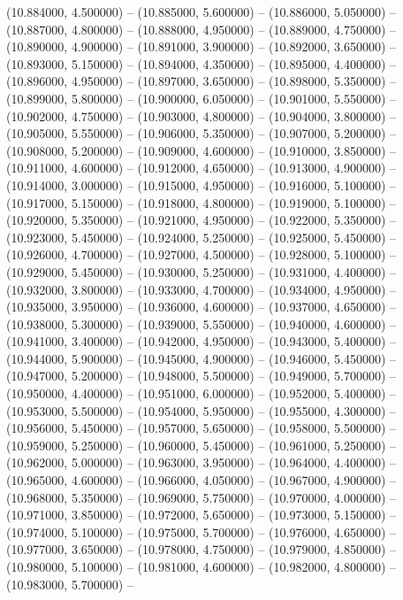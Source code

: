 (10.884000, 4.500000) -- 
(10.885000, 5.600000) -- 
(10.886000, 5.050000) -- 
(10.887000, 4.800000) -- 
(10.888000, 4.950000) -- 
(10.889000, 4.750000) -- 
(10.890000, 4.900000) -- 
(10.891000, 3.900000) -- 
(10.892000, 3.650000) -- 
(10.893000, 5.150000) -- 
(10.894000, 4.350000) -- 
(10.895000, 4.400000) -- 
(10.896000, 4.950000) -- 
(10.897000, 3.650000) -- 
(10.898000, 5.350000) -- 
(10.899000, 5.800000) -- 
(10.900000, 6.050000) -- 
(10.901000, 5.550000) -- 
(10.902000, 4.750000) -- 
(10.903000, 4.800000) -- 
(10.904000, 3.800000) -- 
(10.905000, 5.550000) -- 
(10.906000, 5.350000) -- 
(10.907000, 5.200000) -- 
(10.908000, 5.200000) -- 
(10.909000, 4.600000) -- 
(10.910000, 3.850000) -- 
(10.911000, 4.600000) -- 
(10.912000, 4.650000) -- 
(10.913000, 4.900000) -- 
(10.914000, 3.000000) -- 
(10.915000, 4.950000) -- 
(10.916000, 5.100000) -- 
(10.917000, 5.150000) -- 
(10.918000, 4.800000) -- 
(10.919000, 5.100000) -- 
(10.920000, 5.350000) -- 
(10.921000, 4.950000) -- 
(10.922000, 5.350000) -- 
(10.923000, 5.450000) -- 
(10.924000, 5.250000) -- 
(10.925000, 5.450000) -- 
(10.926000, 4.700000) -- 
(10.927000, 4.500000) -- 
(10.928000, 5.100000) -- 
(10.929000, 5.450000) -- 
(10.930000, 5.250000) -- 
(10.931000, 4.400000) -- 
(10.932000, 3.800000) -- 
(10.933000, 4.700000) -- 
(10.934000, 4.950000) -- 
(10.935000, 3.950000) -- 
(10.936000, 4.600000) -- 
(10.937000, 4.650000) -- 
(10.938000, 5.300000) -- 
(10.939000, 5.550000) -- 
(10.940000, 4.600000) -- 
(10.941000, 3.400000) -- 
(10.942000, 4.950000) -- 
(10.943000, 5.400000) -- 
(10.944000, 5.900000) -- 
(10.945000, 4.900000) -- 
(10.946000, 5.450000) -- 
(10.947000, 5.200000) -- 
(10.948000, 5.500000) -- 
(10.949000, 5.700000) -- 
(10.950000, 4.400000) -- 
(10.951000, 6.000000) -- 
(10.952000, 5.400000) -- 
(10.953000, 5.500000) -- 
(10.954000, 5.950000) -- 
(10.955000, 4.300000) -- 
(10.956000, 5.450000) -- 
(10.957000, 5.650000) -- 
(10.958000, 5.500000) -- 
(10.959000, 5.250000) -- 
(10.960000, 5.450000) -- 
(10.961000, 5.250000) -- 
(10.962000, 5.000000) -- 
(10.963000, 3.950000) -- 
(10.964000, 4.400000) -- 
(10.965000, 4.600000) -- 
(10.966000, 4.050000) -- 
(10.967000, 4.900000) -- 
(10.968000, 5.350000) -- 
(10.969000, 5.750000) -- 
(10.970000, 4.000000) -- 
(10.971000, 3.850000) -- 
(10.972000, 5.650000) -- 
(10.973000, 5.150000) -- 
(10.974000, 5.100000) -- 
(10.975000, 5.700000) -- 
(10.976000, 4.650000) -- 
(10.977000, 3.650000) -- 
(10.978000, 4.750000) -- 
(10.979000, 4.850000) -- 
(10.980000, 5.100000) -- 
(10.981000, 4.600000) -- 
(10.982000, 4.800000) -- 
(10.983000, 5.700000) -- 
